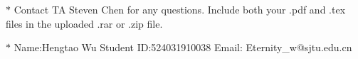 \documentclass[12pt,a4paper]{article}
\theoremstyle{definition}
\begin{document}
\noindent

\noindent{}
\begin{center}
\footnotesize{\color{red}$*$ Contact TA Steven Chen for any questions. Include both your .pdf and .tex files in the uploaded .rar or .zip file.}

\footnotesize{\color{blue}$*$ Name:Hengtao Wu  \quad Student ID:524031910038 \quad Email: Eternity\_w@sjtu.edu.cn}
\end{center}
\end{document}
